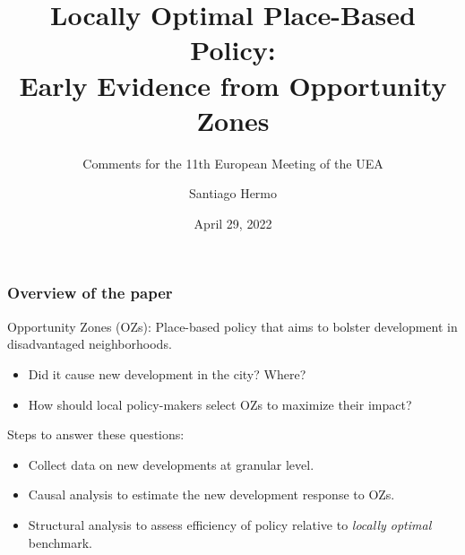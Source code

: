 \documentclass[aspectratio=169, t]{beamer}
\title{Locally Optimal Place-Based Policy: \\ 
       Early Evidence from Opportunity Zones}
\subtitle{\vspace{3mm} Comments for the 11th European Meeting of the UEA}
\date{April 29, 2022}
\author{Santiago Hermo\vspace{-3mm} }
\institute{Brown University}
\begin{document}
\maketitle



\begin{frame}
    \frametitle{Overview of the paper}
    
    Opportunity Zones (OZs): Place-based policy that aims to bolster development in disadvantaged neighborhoods.
    \begin{itemize}
        \item Did it cause new development in the city? Where?
        \item How should local policy-makers select OZs to maximize their impact?
    \end{itemize}
    
    \pause
    \vspace{4mm}
    Steps to answer these questions:
    \begin{itemize}
        \item Collect data on new developments at granular level.
        \item Causal analysis to estimate the new development response to OZs.
        \item Structural analysis to assess efficiency of policy relative to \textit{locally optimal} benchmark.
    \end{itemize}

\end{frame}
\end{document}
